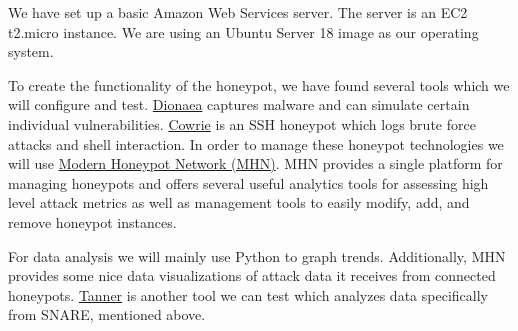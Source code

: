 We have set up a basic Amazon Web Services server. The server is an EC2 t2.micro instance. We are using an Ubuntu Server 18 image as our operating system. 

To create the functionality of the honeypot, we have found several tools which we will configure and test. \href{https://github.com/DinoTools/dionaea}{Dionaea} captures malware and can simulate certain individual vulnerabilities. \href{https://github.com/cowrie/cowrie}{Cowrie} is an SSH honeypot which logs brute force attacks and shell interaction. In order to manage these honeypot technologies we will use \href{https://github.com/pwnlandia/mhn}{Modern Honeypot Network (MHN)}. MHN provides a single platform for managing honeypots and offers several useful analytics tools for assessing high level attack metrics as well as management tools to easily modify, add, and remove honeypot instances.

For data analysis we will mainly use Python to graph trends. Additionally, MHN provides some nice data visualizations of attack data it receives from connected honeypots. \href{https://github.com/mushorg/tanner/}{Tanner} is another tool we can test which analyzes data specifically from SNARE, mentioned above. 
